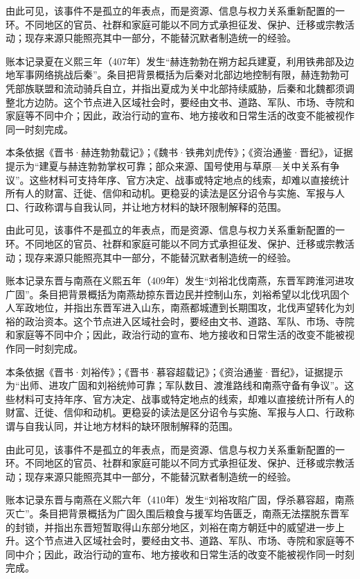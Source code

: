 由此可见，该事件不是孤立的年表点，而是资源、信息与权力关系重新配置的一环。不同地区的官员、社群和家庭可能以不同方式承担征发、保护、迁移或宗教活动；现存来源只能照亮其中一部分，不能替沉默者制造统一的经验。

账本记录夏在义熙三年（407年）发生“赫连勃勃在朔方起兵建夏，利用铁弗部及边地军事网络挑战后秦”。条目把背景概括为后秦对北部边地控制有限，赫连勃勃可凭部族联盟和流动骑兵自立，并指出夏成为关中北部持续威胁，后秦和北魏都须调整北方边防。这个节点进入区域社会时，要经由文书、道路、军队、市场、寺院和家庭等不同中介；因此，政治行动的宣布、地方接收和日常生活的改变不能被视作同一时刻完成。

本条依据《晋书·赫连勃勃载记》；《魏书·铁弗刘虎传》；《资治通鉴·晋纪》，证据提示为“建夏与赫连勃勃掌权可靠；部众来源、国号使用与草原—关中关系有争议”。这些材料可支持年序、官方决定、战事或特定地点的线索，却难以直接统计所有人的财富、迁徙、信仰和动机。更稳妥的读法是区分诏令与实施、军报与人口、行政称谓与自我认同，并让地方材料的缺环限制解释的范围。

由此可见，该事件不是孤立的年表点，而是资源、信息与权力关系重新配置的一环。不同地区的官员、社群和家庭可能以不同方式承担征发、保护、迁移或宗教活动；现存来源只能照亮其中一部分，不能替沉默者制造统一的经验。

账本记录东晋与南燕在义熙五年（409年）发生“刘裕北伐南燕，东晋军跨淮河进攻广固”。条目把背景概括为南燕劫掠东晋边民并控制山东，刘裕希望以北伐巩固个人军政地位，并指出东晋军进入山东，南燕都城遭到长期围攻，北伐声望转化为刘裕的政治资本。这个节点进入区域社会时，要经由文书、道路、军队、市场、寺院和家庭等不同中介；因此，政治行动的宣布、地方接收和日常生活的改变不能被视作同一时刻完成。

本条依据《晋书·刘裕传》；《晋书·慕容超载记》；《资治通鉴·晋纪》，证据提示为“出师、进攻广固和刘裕统帅可靠；军队数目、渡淮路线和南燕守备有争议”。这些材料可支持年序、官方决定、战事或特定地点的线索，却难以直接统计所有人的财富、迁徙、信仰和动机。更稳妥的读法是区分诏令与实施、军报与人口、行政称谓与自我认同，并让地方材料的缺环限制解释的范围。

由此可见，该事件不是孤立的年表点，而是资源、信息与权力关系重新配置的一环。不同地区的官员、社群和家庭可能以不同方式承担征发、保护、迁移或宗教活动；现存来源只能照亮其中一部分，不能替沉默者制造统一的经验。

账本记录东晋与南燕在义熙六年（410年）发生“刘裕攻陷广固，俘杀慕容超，南燕灭亡”。条目把背景概括为广固久围后粮食与援军均告匮乏，南燕无法摆脱东晋军的封锁，并指出东晋短暂取得山东部分地区，刘裕在南方朝廷中的威望进一步上升。这个节点进入区域社会时，要经由文书、道路、军队、市场、寺院和家庭等不同中介；因此，政治行动的宣布、地方接收和日常生活的改变不能被视作同一时刻完成。

